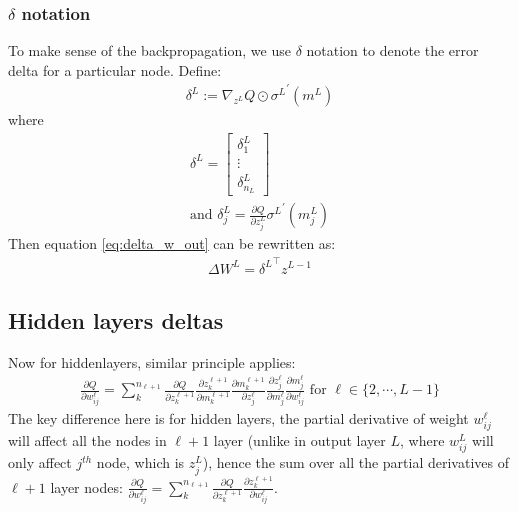 \documentclass{article} [10pt] %
\begin{document}
\subsubsection{$\delta$ notation}
To make sense of the backpropagation, we use $\delta$ notation to denote the error delta for a particular node. Define:
\begin{align}
	\delta^L := \nabla_{z^L}Q \odot {\sigma^L}^\prime(m^L)
\end{align}
where
\begin{align}
	\delta^L = \begin{bmatrix} \delta^L_1\\ \vdots\\ \delta^L_{n_L}\end{bmatrix} \\
	\text{and } \delta^L_j =\frac{\partial Q}{\partial z^L_{j}}{\sigma^L}^\prime(m^L_{j}) \label{eq:node_delta_output}
\end{align}
Then equation \eqref{eq:delta_w_out} can be rewritten as:
\begin{align}
	\Delta W^L = {\delta^L}^\top z^{L-1}
\end{align}

\subsection{Hidden layers deltas}
Now for hiddenlayers, similar principle applies:
\begin{align} \label{eq:hidden_delta}
\boxed{
	\frac{\partial Q}{\partial w^\ell_{ij}} = \sum_k^{n_{\ell+1}}\frac{\partial Q}{\partial z^{\ell+1}_{k}}
							\frac{\partial z^{\ell+1}_{k}}{\partial m^{\ell+1}_{k}}
							\frac{\partial m^{\ell+1}_{k}}{\partial z^\ell_j}
							\frac{\partial z^\ell_j}{\partial m^\ell_{j}}
							\frac{\partial m^\ell_{j}}{\partial w^\ell_{ij}}
\text{ for } \ell \in \{2, \cdots, L-1\}
}
\end{align}
The key difference here is for hidden layers, the partial derivative of weight $w^\ell_{ij}$ will affect all the nodes in $\ell+1$ layer (unlike in output layer $L$, where $w^L_{ij}$ will only affect $j^{th}$ node, which is $z^L_j$), hence the sum over all the partial derivatives of $\ell+1$ layer nodes: $\frac{\partial Q}{\partial w^\ell_{ij}} = \sum_k^{n_{\ell+1}}\frac{\partial Q}{\partial z^{\ell+1}_{k}}\frac{\partial z^{\ell+1}_{k}}{\partial w^\ell_{ij}}$.
\end{document}
